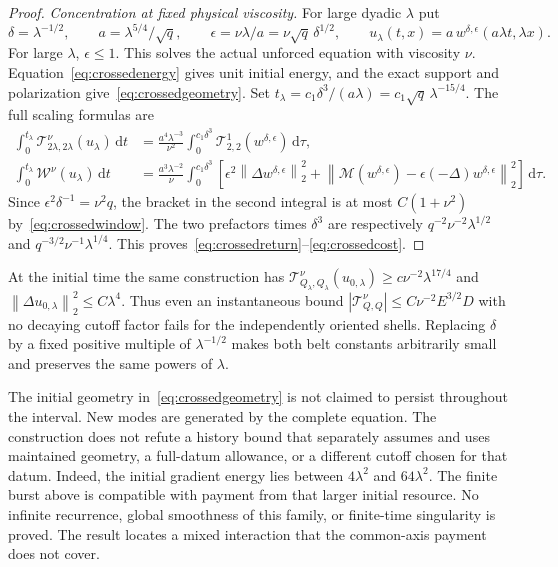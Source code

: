 \documentclass[11pt]{article}
\newcommand{\dd}{\,\mathrm d}
\newcommand{\norm}[1]{\left\lVert#1\right\rVert}
\begin{document}
\begin{proof}
\emph{Concentration at fixed physical viscosity.}
For large dyadic $\lambda$ put
\[
 \delta=\lambda^{-1/2},\qquad
 a=\lambda^{5/4}/\sqrt q,\qquad
 \epsilon=\nu\lambda/a=\nu\sqrt q\,\delta^{1/2},
 \qquad
 u_\lambda(t,x)=a\,w^{\delta,\epsilon}(a\lambda t,\lambda x).
\]
For large $\lambda$, $\epsilon\leq1$. This solves the actual unforced
equation with viscosity $\nu$. Equation~\eqref{eq:crossedenergy}
gives unit initial energy, and the exact support and polarization
give~\eqref{eq:crossedgeometry}. Set
$t_\lambda=c_1\delta^3/(a\lambda)=c_1\sqrt q\,\lambda^{-15/4}$.
The full scaling formulas are
\begin{align*}
 \int_0^{t_\lambda}\mathcal T_{2\lambda,2\lambda}^\nu(u_\lambda)\dd t
 &=\frac{a^4\lambda^{-3}}{\nu^2}
       \int_0^{c_1\delta^3}\mathcal T_{2,2}^1(w^{\delta,\epsilon})\dd\tau,\\
 \int_0^{t_\lambda}\mathcal W^\nu(u_\lambda)\dd t
 &=\frac{a^3\lambda^{-2}}{\nu}
       \int_0^{c_1\delta^3}
       \left[\epsilon^2\norm{\Delta w^{\delta,\epsilon}}_2^2+
       \norm{\mathcal M(w^{\delta,\epsilon})
                    -\epsilon(-\Delta)w^{\delta,\epsilon}}_2^2\right]\dd\tau.
\end{align*}
Since $\epsilon^2\delta^{-1}=\nu^2q$, the bracket in the second
integral is at most $C(1+\nu^2)$ by~\eqref{eq:crossedwindow}.
The two prefactors times $\delta^3$ are respectively
$q^{-2}\nu^{-2}\lambda^{1/2}$ and
$q^{-3/2}\nu^{-1}\lambda^{1/4}$.
This proves~\eqref{eq:crossedreturn}--\eqref{eq:crossedcost}.
\end{proof}

At the initial time the same construction has
$\mathcal T_{Q_\lambda,Q_\lambda}^\nu(u_{0,\lambda})
 \geq c\nu^{-2}\lambda^{17/4}$ and
$\norm{\Delta u_{0,\lambda}}_2^2\leq C\lambda^4$.
Thus even an instantaneous bound
$|\mathcal T_{Q,Q}^\nu|\leq C\nu^{-2}E^{3/2}D$ with no decaying
cutoff factor fails for the independently oriented shells.
Replacing $\delta$ by a fixed positive multiple of $\lambda^{-1/2}$
makes both belt constants arbitrarily small and preserves the
same powers of $\lambda$.

The initial geometry in~\eqref{eq:crossedgeometry} is not claimed
to persist throughout the interval. New modes are generated by the
complete equation. The construction does not refute a history bound
that separately assumes and uses maintained geometry, a full-datum
allowance, or a different cutoff chosen for that datum.
Indeed, the initial gradient energy lies between
$4\lambda^2$ and $64\lambda^2$. The finite burst above is compatible
with payment from that larger initial resource. No infinite recurrence,
global smoothness of this family, or finite-time singularity is proved.
The result locates a mixed interaction that the common-axis payment
does not cover.
\end{document}
